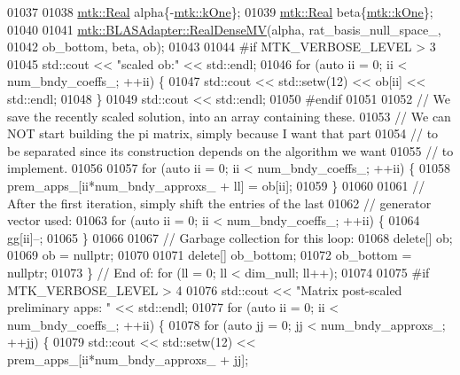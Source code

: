 \begin{DoxyCode}
{{01037 
01038     \hyperlink{group__c01-roots_gac080bbbf5cbb5502c9f00405f894857d}{mtk::Real} alpha\{-\hyperlink{group__c01-roots_ga26407c24d43b6b95480943340d285c71}{mtk::kOne}\};
01039     \hyperlink{group__c01-roots_gac080bbbf5cbb5502c9f00405f894857d}{mtk::Real} beta\{\hyperlink{group__c01-roots_ga26407c24d43b6b95480943340d285c71}{mtk::kOne}\};
01040 
01041     \hyperlink{classmtk_1_1BLASAdapter_afdcac059a4294287cb55638221220646}{mtk::BLASAdapter::RealDenseMV}(alpha, rat\_basis\_null\_space\_,
01042                                   ob\_bottom, beta, ob);
01043 
01044 \textcolor{preprocessor}{    #if MTK\_VERBOSE\_LEVEL > 3}
01045     std::cout << \textcolor{stringliteral}{"scaled ob:"} << std::endl;
01046     \textcolor{keywordflow}{for} (\textcolor{keyword}{auto} ii = 0; ii < num\_bndy\_coeffs\_; ++ii) \{
01047       std::cout << std::setw(12) << ob[ii] << std::endl;
01048     \}
01049     std::cout << std::endl;
01050 \textcolor{preprocessor}{    #endif}
01051 
01052     \textcolor{comment}{// We save the recently scaled solution, into an array containing these.}
01053     \textcolor{comment}{// We can NOT start building the pi matrix, simply because I want that part}
01054     \textcolor{comment}{// to be separated since its construction depends on the algorithm we want}
01055     \textcolor{comment}{// to implement.}
01056 
01057     \textcolor{keywordflow}{for} (\textcolor{keyword}{auto} ii = 0; ii < num\_bndy\_coeffs\_; ++ii) \{
01058       prem\_apps\_[ii*num\_bndy\_approxs\_ + ll] = ob[ii];
01059     \}
01060 
01061     \textcolor{comment}{// After the first iteration, simply shift the entries of the last}
01062     \textcolor{comment}{// generator vector used:}
01063     \textcolor{keywordflow}{for} (\textcolor{keyword}{auto} ii = 0; ii < num\_bndy\_coeffs\_; ++ii) \{
01064       gg[ii]--;
01065     \}
01066 
01067     \textcolor{comment}{// Garbage collection for this loop:}
01068     \textcolor{keyword}{delete}[] ob;
01069     ob = \textcolor{keyword}{nullptr};
01070 
01071     \textcolor{keyword}{delete}[] ob\_bottom;
01072     ob\_bottom = \textcolor{keyword}{nullptr};
01073   \} \textcolor{comment}{// End of: for (ll = 0; ll < dim\_null; ll++);}
01074 
01075 \textcolor{preprocessor}{  #if MTK\_VERBOSE\_LEVEL > 4}
01076   std::cout << \textcolor{stringliteral}{"Matrix post-scaled preliminary apps: "} << std::endl;
01077   \textcolor{keywordflow}{for} (\textcolor{keyword}{auto} ii = 0; ii < num\_bndy\_coeffs\_; ++ii) \{
01078     \textcolor{keywordflow}{for} (\textcolor{keyword}{auto} jj = 0; jj < num\_bndy\_approxs\_; ++jj) \{
01079       std::cout << std::setw(12) << prem\_apps\_[ii*num\_bndy\_approxs\_ + jj];
}}
\end{DoxyCode}
